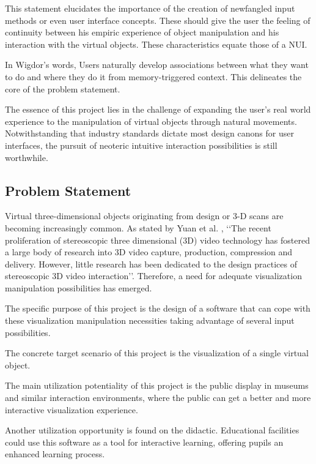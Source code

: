 \documentclass[12pt]{extarticle}
\begin{document}
This statement elucidates the importance of the creation of newfangled input methods or even user interface concepts. These should give the user the feeling of continuity between his empiric experience of object manipulation and his interaction with the virtual objects. These characteristics equate those of a NUI.

In Wigdor\rq{}s words, \cite{NUIWorld} Users naturally develop associations between what they want to do and where they do it from memory-triggered context. This delineates the core of the problem statement.

The essence of this project lies in the challenge of expanding the user\rq{}s real world experience to the manipulation of virtual objects through natural movements. Notwithstanding that industry standards dictate most design canons for user interfaces, the pursuit of neoteric intuitive interaction possibilities is still worthwhile.

\subsection{Problem Statement}
Virtual three-dimensional objects originating from design or 3-D scans are becoming increasingly common. As stated by Yuan et al. \cite{3DTV}, \lq\lq{}The recent proliferation of stereoscopic three dimensional (3D) video technology has fostered a large body of research into 3D video capture, production, compression and delivery. However, little research has been dedicated to the design practices of stereoscopic 3D video interaction\rq\rq{}. Therefore, a need for adequate visualization manipulation possibilities has emerged.

The specific purpose of this project is the design of a software that can cope with these visualization manipulation necessities taking advantage of several input possibilities.

The concrete target scenario of this project is the visualization of a single virtual object.

The main utilization potentiality of this project is the public display in museums and similar interaction environments, where the public can get a better and more interactive visualization experience.

Another utilization opportunity is found on the didactic. Educational facilities could use this software as a tool for interactive learning, offering pupils an enhanced learning process.
\end{document}
